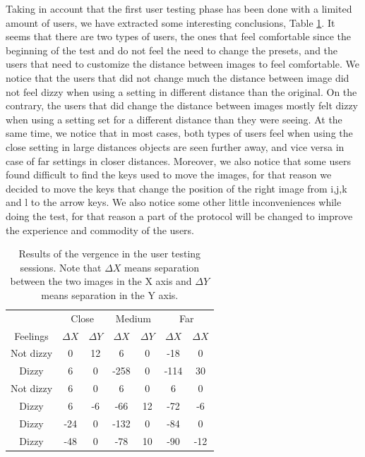 \documentclass[10pt,a4paper,twocolumn,twoside]{article}
\begin{document}
	Taking in account that the first user testing phase has been done with a limited amount of users, we have extracted some interesting conclusions, Table \ref{tab:userTestResults}. It seems that there are two types of users, the ones that feel comfortable since the beginning of the test and do not feel the need to change the presets, and the users that need to customize the distance between images to feel comfortable.
	We notice that the users that did not change much the distance between image did not feel dizzy when using a setting in different distance than the original. On the contrary, the users that did change the distance between images mostly felt dizzy when using a setting set for a different distance than they were seeing. At the same time, we notice that in most cases, both types of users feel when using the close setting in large distances objects are seen further away, and vice versa in case of far settings in closer distances.
	Moreover, we also notice that some users found difficult to find the keys used to move the images, for that reason we decided to move the keys that change the position of the right image from i,j,k and l to the arrow keys. We also notice some other little inconveniences while doing the test, for that reason a part of the protocol will be changed to improve the experience and commodity of the users.
	
	

\begin{table}
	\begin{center}
		\begin{tabular}{ccccccc}
			\toprule
			 & \multicolumn{2}{c}{Close} & \multicolumn{2}{c}{Medium} & \multicolumn{2}{c}{Far} \\ 
			Feelings & $\Delta X$ & $\Delta Y$ & $\Delta X$ & $\Delta Y$ & $\Delta X$ & $\Delta X$ \\ 
			\midrule
			Not dizzy & 0 & 12 & 6 & 0 & -18 & 0 \\ 
			\midrule 
		 	Dizzy & 6 & 0 & -258 & 0 & -114 & 30 \\ 
			\midrule
			Not dizzy & 6 & 0 & 6 & 0 & 6 & 0 \\ 
			\midrule 
			Dizzy & 6 & -6 & -66 & 12 & -72 & -6 \\ 
			\midrule
			Dizzy & -24 & 0 & -132 & 0 & -84 & 0 \\ 
			\midrule
			Dizzy & -48 & 0 & -78 & 10 & -90 & -12 \\ 
			\bottomrule
		\end{tabular} 
	\caption{Results of the vergence in the user testing sessions. Note that $\Delta X$ means separation between the two images in the X axis and $\Delta Y$ means separation in the Y axis. }
	\label{tab:userTestResults}
	\end{center}
\end{table}
	
\end{document}

